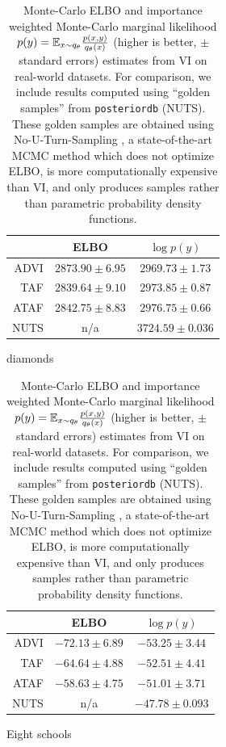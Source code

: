 \documentclass[twoside]{article}
\theoremstyle{definition}
\theoremstyle{remark}
\begin{document}
\begin{table}[htbp]
  \centering
    \begin{subfigure}[t]{0.49\textwidth}
        \centering
        \begin{tabular}{rcc}
            \toprule
                      & ELBO                & $\log p(y)$       \\
            \midrule
            ADVI      & $2873.90 \pm 6.95$    & $2969.73 \pm 1.73$ \\
            TAF       & $2839.64 \pm 9.10$    & $2973.85 \pm 0.87$ \\
            ATAF      & $2842.75 \pm 8.83$    & $2976.75 \pm 0.66$ \\
            NUTS      & n/a                  & $3724.59 \pm 0.036$ \\
            \bottomrule
        \end{tabular}
        \caption{diamonds}
        \label{tab:diamonds}
    \end{subfigure}
    \begin{subfigure}[t]{0.49\textwidth}
        \centering
        \begin{tabular}{rcc}
            \toprule
                      & ELBO                & $\log p(y)$       \\
            \midrule
            ADVI      & $-72.13 \pm 6.89$    & $-53.25 \pm 3.44$ \\
            TAF       & $-64.64 \pm 4.88$    & $-52.51 \pm 4.41$ \\
            ATAF      & $-58.63 \pm 4.75$    & $-51.01 \pm 3.71$ \\
            NUTS      & n/a                  & $-47.78 \pm 0.093$ \\
            \bottomrule
        \end{tabular}
        \caption{Eight schools}
        \label{tab:eight_schools}
    \end{subfigure}

        \caption{Monte-Carlo ELBO and importance weighted Monte-Carlo marginal likelihood
        $p(y) = \mathbb{E}_{x \sim q_\theta} \frac{p(x,y)}{q_\theta(x)}$ (higher is better, $\pm$ standard errors) 
        estimates from VI on real-world datasets.
        For comparison, we include results computed using ``golden samples'' from \texttt{posteriordb} \citep{ghposteriordb} (NUTS).
        These golden samples are obtained using No-U-Turn-Sampling \citep{hoffman2014no,carpenter2017stan},
        a state-of-the-art MCMC method which does not optimize ELBO, is more computationally expensive than
        VI, and only produces samples rather than parametric probability density functions.
    }
  \label{fig:eight_schools}
  \vspace{-4mm}
\end{table}
\end{document}
